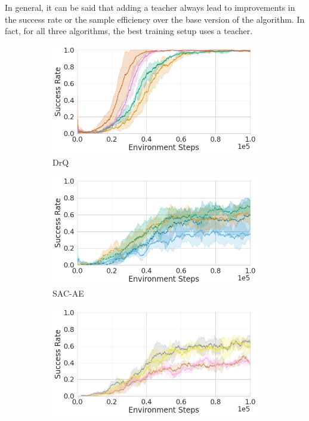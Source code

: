 In general, it can be said that adding a teacher always lead to improvements in the success rate or the sample efficiency over the base version of the algorithm. In fact, for all three algorithms, the best training setup uses a teacher.

\begin{figure}
    \centering
    \begin{subfigure}[b]{.32\textwidth}
        \centering
        \includegraphics[width=\textwidth]{images/results/reach/drq.png}
        \caption{DrQ}
        \label{fig:results:reach:drq}
    \end{subfigure}
    \hfill
    \begin{subfigure}[b]{.32\textwidth}
        \centering
        \includegraphics[width=\textwidth]{images/results/reach/sacae.png}
        \caption{SAC-AE}
        \label{fig:results:reach:sacae}
    \end{subfigure}
    \hfill
    \begin{subfigure}[b]{.32\textwidth}
        \centering
        \includegraphics[width=\textwidth]{images/results/reach/sac.png}

\end{subfigure}
\end{figure}
